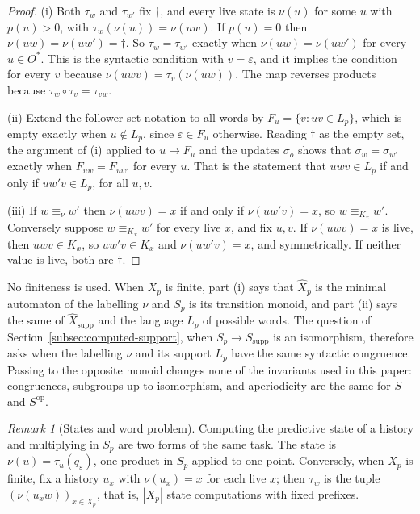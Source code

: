 \documentclass[10pt]{article}
\theoremstyle{definition}
\theoremstyle{remark}
\newtheorem{remark}[theorem]{Remark}
\newcommand{\Obs}{O}
\newcommand{\eps}{\varepsilon}
\begin{document}
\begin{proof}
(i) Both $\tau_w$ and $\tau_{w'}$ fix $\dagger$, and every live state
is $\nu(u)$ for some $u$ with $p(u)>0$, with
$\tau_w(\nu(u))=\nu(uw)$.  If $p(u)=0$ then
$\nu(uw)=\nu(uw')=\dagger$.  So $\tau_w=\tau_{w'}$ exactly when
$\nu(uw)=\nu(uw')$ for every $u\in\Obs^*$.  This is the syntactic
condition with $v=\eps$, and it implies the condition for every $v$
because $\nu(uwv)=\tau_v(\nu(uw))$.  The map reverses products because
$\tau_w\circ\tau_v=\tau_{vw}$.

(ii) Extend the follower-set notation to all words by
$F_u=\{v:uv\in L_p\}$, which is empty exactly when $u\notin L_p$,
since $\eps\in F_u$ otherwise.  Reading $\dagger$ as the empty set,
the argument of (i) applied to $u\mapsto F_u$ and the updates
$\sigma_o$ shows that $\sigma_w=\sigma_{w'}$ exactly when
$F_{uw}=F_{uw'}$ for every $u$.  That is the statement that
$uwv\in L_p$ if and only if $uw'v\in L_p$, for all $u,v$.

(iii) If $w\equiv_\nu w'$ then $\nu(uwv)=x$ if and only if
$\nu(uw'v)=x$, so $w\equiv_{K_x}w'$.  Conversely suppose
$w\equiv_{K_x}w'$ for every live $x$, and fix $u,v$.  If
$\nu(uwv)=x$ is live, then $uwv\in K_x$, so $uw'v\in K_x$ and
$\nu(uw'v)=x$, and symmetrically.  If neither value is live, both are
$\dagger$.
\end{proof}

No finiteness is used.  When $X_p$ is finite, part (i) says that
$\widehat X_p$ is the minimal automaton of the labelling $\nu$ and
$S_p$ is its transition monoid, and part (ii) says the same of
$\widehat X_{\mathrm{supp}}$ and the language $L_p$ of possible
words.  The question of
Section~\ref{subsec:computed-support}, when $S_p\to S_{\mathrm{supp}}$
is an isomorphism, therefore asks when the labelling $\nu$ and its
support $L_p$ have the same syntactic congruence.  Passing to the
opposite monoid changes none of the invariants used in this paper:
congruences, subgroups up to isomorphism, and aperiodicity are the
same for $S$ and $S^{\mathrm{op}}$.

\begin{remark}[States and word problem]
\label{rem:word-problem}
Computing the predictive state of a history and multiplying in $S_p$
are two forms of the same task.  The state is
$\nu(u)=\tau_u(q_\eps)$, one product in $S_p$ applied to one point.
Conversely, when $X_p$ is finite, fix a history $u_x$ with
$\nu(u_x)=x$ for each live $x$; then $\tau_w$ is the tuple
$(\nu(u_xw))_{x\in X_p}$, that is, $|X_p|$ state computations with
fixed prefixes.
\end{remark}
\end{document}
